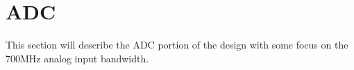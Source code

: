 \section{ADC} %
\label{sec:adc}
    This section will describe the ADC portion of the design with some focus on the 700MHz
    analog input bandwidth.

